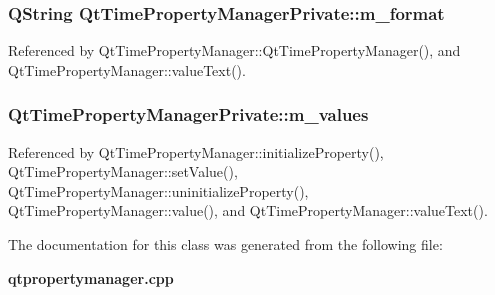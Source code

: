 \subsubsection[{m\+\_\+format}]{\setlength{\rightskip}{0pt plus 5cm}Q\+String Qt\+Time\+Property\+Manager\+Private\+::m\+\_\+format}\label{classQtTimePropertyManagerPrivate_a0de7831d9b8efdf2d053f8bc22f5541a}


Referenced by Qt\+Time\+Property\+Manager\+::\+Qt\+Time\+Property\+Manager(), and Qt\+Time\+Property\+Manager\+::value\+Text().

\subsubsection[{m\+\_\+values}]{ Qt\+Time\+Property\+Manager\+Private\+::m\+\_\+values}\label{classQtTimePropertyManagerPrivate_ac5db18630174cb6013e404a241c33dd8}


Referenced by Qt\+Time\+Property\+Manager\+::initialize\+Property(), Qt\+Time\+Property\+Manager\+::set\+Value(), Qt\+Time\+Property\+Manager\+::uninitialize\+Property(), Qt\+Time\+Property\+Manager\+::value(), and Qt\+Time\+Property\+Manager\+::value\+Text().



The documentation for this class was generated from the following file\+:\begin{DoxyCompactItemize}
\item 
{\bf qtpropertymanager.\+cpp}\end{DoxyCompactItemize}
